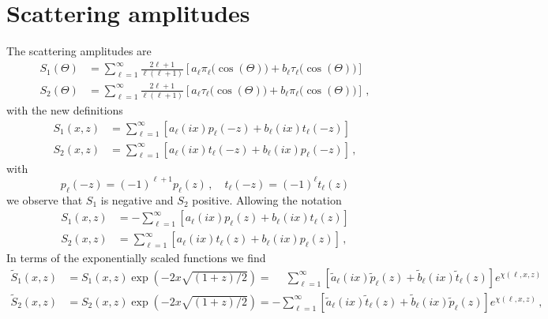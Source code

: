 \documentclass[onecolumn%
              ,superscriptaddress%
              ,aps%
              ,pra]{revtex4}
\begin{document}
\section{Scattering amplitudes}
The scattering amplitudes are
\begin{equation}
\begin{aligned}
S_1(\Theta) &= \sum_{\ell=1}^\infty \frac{2\ell+1}{\ell(\ell+1)}
    \left[ a_\ell\pi_\ell\big(\cos(\Theta)\big) + b_\ell\tau_\ell\big(\cos(\Theta)\big)\right]\\
S_2(\Theta) &= \sum_{\ell=1}^\infty \frac{2\ell+1}{\ell(\ell+1)}
    \left[ a_\ell\tau_\ell\big(\cos(\Theta)\big) + b_\ell\pi_\ell\big(\cos(\Theta)\big)\right]\,,
\end{aligned}
\end{equation}
with the new definitions
\begin{equation}
\begin{aligned}
S_1(x, z) &= \sum_{\ell=1}^\infty 
    \left[ a_\ell(ix) p_\ell(-z) + b_\ell(ix) t_\ell(-z)\right]\\
S_2(x, z) &= \sum_{\ell=1}^\infty \left[ a_\ell(i x) t_\ell(-z) + b_\ell(i x) p_\ell(-z)\right]\,,
\end{aligned}
\end{equation}
with
\begin{equation}
p_\ell(-z) = (-1)^{\ell+1} p_\ell(z)\,,\quad t_\ell(-z) = (-1)^{\ell} t_\ell(z)
\end{equation}
we observe that $S_1$ is negative and $S_2$ positive.
Allowing the notation
\begin{equation}
\begin{aligned}
S_1(x, z) &= -\sum_{\ell=1}^\infty 
    \left[ a_\ell(ix) p_\ell(z) + b_\ell(ix) t_\ell(z)\right]\\
S_2(x, z) &= \sum_{\ell=1}^\infty \left[ a_\ell(i x) t_\ell(z) + b_\ell(i x) p_\ell(z)\right]\,,
\end{aligned}
\end{equation}
In terms of the exponentially scaled functions we find
\begin{equation}
\begin{aligned}
\tilde S_1(x, z) &= S_1(x, z) \exp(-2x\sqrt{(1+z)/2}) = \phantom{-}\sum_{\ell=1}^\infty 
    \left[ \tilde a_\ell(ix) \tilde p_\ell(z) +  \tilde b_\ell(ix) \tilde t_\ell(z)\right]e^{\chi(\ell,x,z)}\\
\tilde S_2(x, z) &= S_2(x, z) \exp(-2x\sqrt{(1+z)/2}) =-\sum_{\ell=1}^\infty \left[\tilde a_\ell(i x)\tilde t_\ell(z) +\tilde b_\ell(i x)\tilde p_\ell(z)\right]e^{\chi(\ell,x,z)}\,,
\end{aligned}
\end{equation}
\end{document}
